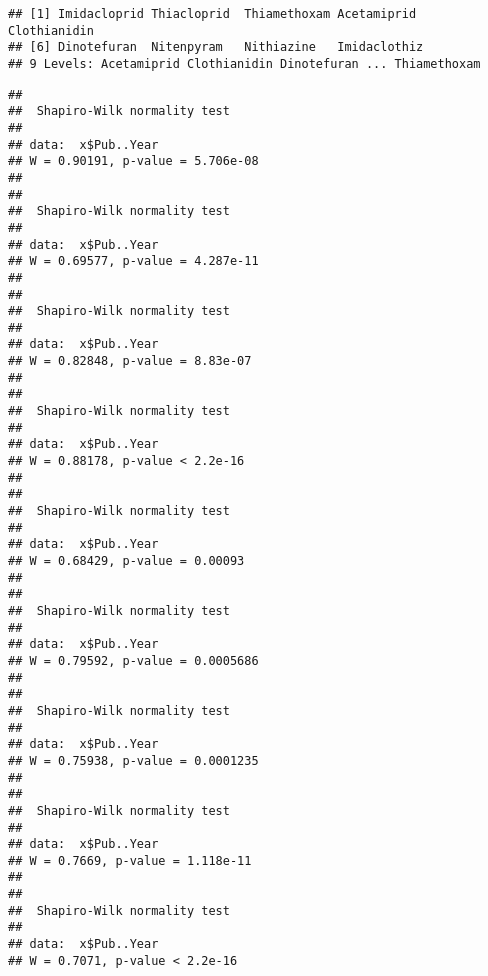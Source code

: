 \documentclass[]{article}
\newenvironment{Shaded}{\begin{snugshade}}{\end{snugshade}}
\newcommand{\KeywordTok}[1]{\textcolor[rgb]{0.13,0.29,0.53}{\textbf{#1}}}
\newcommand{\StringTok}[1]{\textcolor[rgb]{0.31,0.60,0.02}{#1}}
\newcommand{\CommentTok}[1]{\textcolor[rgb]{0.56,0.35,0.01}{\textit{#1}}}
\newcommand{\ControlFlowTok}[1]{\textcolor[rgb]{0.13,0.29,0.53}{\textbf{#1}}}
\newcommand{\OperatorTok}[1]{\textcolor[rgb]{0.81,0.36,0.00}{\textbf{#1}}}
\newcommand{\NormalTok}[1]{#1}
\begin{document}
\begin{Shaded}
\end{Shaded}

\begin{verbatim}
## [1] Imidacloprid Thiacloprid  Thiamethoxam Acetamiprid  Clothianidin
## [6] Dinotefuran  Nitenpyram   Nithiazine   Imidaclothiz
## 9 Levels: Acetamiprid Clothianidin Dinotefuran ... Thiamethoxam
\end{verbatim}

\begin{Shaded}
\end{Shaded}

\begin{verbatim}
## 
##  Shapiro-Wilk normality test
## 
## data:  x$Pub..Year
## W = 0.90191, p-value = 5.706e-08
## 
## 
##  Shapiro-Wilk normality test
## 
## data:  x$Pub..Year
## W = 0.69577, p-value = 4.287e-11
## 
## 
##  Shapiro-Wilk normality test
## 
## data:  x$Pub..Year
## W = 0.82848, p-value = 8.83e-07
## 
## 
##  Shapiro-Wilk normality test
## 
## data:  x$Pub..Year
## W = 0.88178, p-value < 2.2e-16
## 
## 
##  Shapiro-Wilk normality test
## 
## data:  x$Pub..Year
## W = 0.68429, p-value = 0.00093
## 
## 
##  Shapiro-Wilk normality test
## 
## data:  x$Pub..Year
## W = 0.79592, p-value = 0.0005686
## 
## 
##  Shapiro-Wilk normality test
## 
## data:  x$Pub..Year
## W = 0.75938, p-value = 0.0001235
## 
## 
##  Shapiro-Wilk normality test
## 
## data:  x$Pub..Year
## W = 0.7669, p-value = 1.118e-11
## 
## 
##  Shapiro-Wilk normality test
## 
## data:  x$Pub..Year
## W = 0.7071, p-value < 2.2e-16
\end{verbatim}
\end{document}
